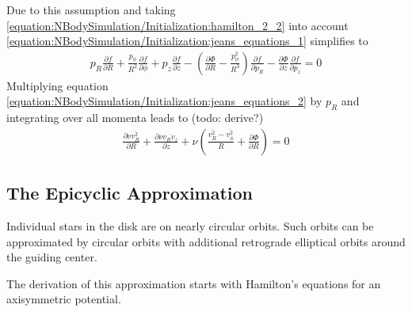 \documentclass[letterpaper,10pt,english]{sphinxmanual}
\begin{document}
Due to this assumption and taking \eqref{equation:NBodySimulation/Initialization:hamilton_2_2} into account \eqref{equation:NBodySimulation/Initialization:jeans_equations_1} simplifies to
\begin{equation}\label{equation:NBodySimulation/Initialization:jeans_equations_2}
\begin{split}p_R\frac{\partial f}{\partial R}
 + \frac{p_\phi}{R^2}\frac{\partial f}{\partial \phi}
 + p_z\frac{\partial f}{\partial z}
 - \left(\frac{\partial \Phi}{\partial R}-\frac{p_\phi^2}{R^3}\right)\frac{\partial f}{\partial p_R}
 - \frac{\partial \Phi}{\partial z}\frac{\partial f}{\partial p_z} = 0\end{split}
\end{equation}
\sphinxAtStartPar
Multiplying equation \eqref{equation:NBodySimulation/Initialization:jeans_equations_2} by \(p_R\) and integrating over all momenta leads to (todo: derive?)
\begin{equation}\label{equation:NBodySimulation/Initialization:jeans_equations_3}
\begin{split}\frac{\partial \nu \overline{v_R^2}}{\partial R}+\frac{\partial \nu \overline{v_Rv_z}}{\partial z} +
 \nu \left ( \frac{\overline{v_R^2}-\overline{v_\phi^2}}{R} + \frac{\partial\Phi}{\partial R}\right ) = 0\end{split}
\end{equation}

\subsection{The Epicyclic Approximation}
\label{\detokenize{NBodySimulation/Initialization:the-epicyclic-approximation}}
\sphinxAtStartPar
Individual stars in the disk are on nearly circular orbits.
Such orbits can be approximated by circular orbits with additional retrograde elliptical orbits around the guiding center.

\sphinxAtStartPar
The derivation of this approximation starts with Hamilton’s equations for an axisymmetric potential.
\end{document}
